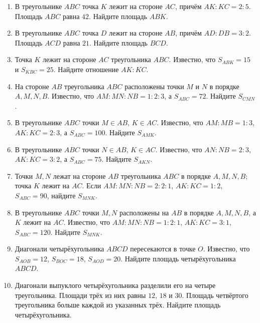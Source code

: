 \documentclass[a4paper,12pt]{article}
\begin{document}
\begin{enumerate}
\item В треугольнике $ABC$ точка $K$ лежит на стороне $AC$, причём $AK:KC=2:5$. Площадь $ABC$ равна $42$. Найдите площадь $ABK$.

\item В треугольнике $ABC$ точка $D$ лежит на стороне $AB$, причём $AD:DB=3:2$. Площадь $ACD$ равна $21$. Найдите площадь $BCD$.

\item Точка $K$ лежит на стороне $AC$ треугольника $ABC$. Известно, что $S_{ABK}=15$ и $S_{KBC}=25$. Найдите отношение $AK:KC$.

\item На стороне $AB$ треугольника $ABC$ расположены точки $M$ и $N$ в порядке $A,M,N,B$. Известно, что $AM:MN:NB=1:2:3$, а $S_{ABC}=72$. Найдите $S_{CMN}$.

\item В треугольнике $ABC$ точки $M\in AB$, $K\in AC$. Известно, что $AM:MB=1:3$, $AK:KC=2:3$, а $S_{ABC}=100$. Найдите $S_{AMK}$.

\item В треугольнике $ABC$ точки $N\in AB$, $K\in AC$. Известно, что $AN:NB=2:3$, $AK:KC=3:2$, а $S_{ABC}=75$. Найдите $S_{AKN}$.

\item Точки $M,N$ лежат на стороне $AB$ треугольника $ABC$ в порядке $A,M,N,B$; точка $K$ лежит на $AC$. Если $AM:MN:NB=2:2:1$, $AK:KC=1:2$, $S_{ABC}=90$, найдите $S_{MNK}$.

\item В треугольнике $ABC$ точки $M,N$ расположены на $AB$ в порядке $A,M,N,B$, а $K$ лежит на $AC$. Известно, что $AM:MN:NB=1:2:1$, $AK:KC=3:1$, $S_{ABC}=120$. Найдите $S_{MNK}$.

\item Диагонали четырёхугольника $ABCD$ пересекаются в точке $O$. Известно, что $S_{AOB}=12$, $S_{BOC}=18$, $S_{AOD}=20$. Найдите площадь четырёхугольника $ABCD$.

\item Диагонали выпуклого четырёхугольника разделили его на четыре треугольника. Площади трёх из них равны $12$, $18$ и $30$. Площадь четвёртого треугольника больше каждой из указанных трёх. Найдите площадь четырёхугольника.
\end{enumerate}
\end{document}
